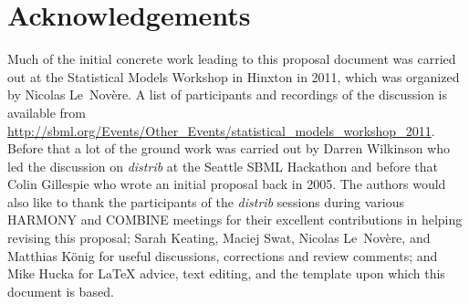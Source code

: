 \documentclass[draftspec]{sbmlpkgspec}
\newcommand{\distribshort}{\emph{distrib}\xspace}
\begin{document}
\section{Acknowledgements}
\label{sec:acknowledgements}

Much of the initial concrete work leading to this proposal document
was carried out at the Statistical Models Workshop in Hinxton in 2011,
which was organized by Nicolas Le~Nov\`{e}re. A list of participants
and recordings of the discussion is available from
\url{http://sbml.org/Events/Other_Events/statistical_models_workshop_2011}.
Before that a lot of the ground work was carried out by Darren
Wilkinson who led the discussion on \distribshort at the Seattle SBML
Hackathon and before that Colin Gillespie who wrote an initial
proposal back in 2005. The authors would also like to thank the
participants of the \distribshort sessions during various HARMONY and
COMBINE meetings for their excellent contributions in helping revising
this proposal; Sarah Keating, Maciej Swat, Nicolas Le~Nov\`{e}re, and Matthias K\"{o}nig
for useful discussions, corrections and review comments; and Mike
Hucka for \LaTeX{} advice, text editing, and the template upon which this
document is based.

\appendix



%
%





\end{document}
